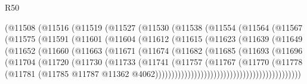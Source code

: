 \begin{lexlean}{R50}
\begin{coremodule}
                  (@11508
                    (@11516
                      (@11519
                        (@11527
                          (@11530
                            (@11538
                              (@11554
                                (@11564
                                  (@11567
                                    (@11575
                                      (@11591
                                        (@11601
                                          (@11604
                                            (@11612
                                              (@11615
                                                (@11623
                                                  (@11639
                                                    (@11649
                                                      (@11652
                                                        (@11660
                                                          (@11663
                                                            (@11671
                                                              (@11674
                                                                (@11682
                                                                  (@11685
                                                                    (@11693
                                                                      (@11696
                                                                        (@11704
                                                                          (@11720
                                                                            (@11730
                                                                              (@11733
                                                                                (@11741
                                                                                  (@11757
                                                                                    (@11767
                                                                                      (@11770
                                                                                        (@11778
                                                                                          (@11781
                                                                                            (@11785
                                                                                              @11787
                                                                                              @11362
                                                                                              @4062)))))))))))))))))))))))))))))))))))))))))))))

\end{coremodule}
\end{lexlean}
